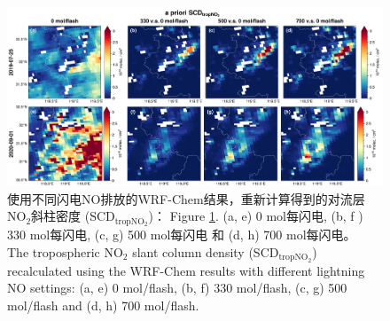 \begin{figure}[htbp]
    \includegraphics[width=17cm]{./figures/s5p_apriori_scd.png}
    \caption{使用不同闪电NO排放的WRF-Chem结果，重新计算得到的对流层NO$_2$斜柱密度 (SCD$_\textrm{tropNO$_2$}$)：
    Figure \ref{fig:s5p_apriori_scd}. (a, e) 0 mol每闪电, (b, f ) 330 mol每闪电, (c, g) 500 mol每闪电 和 (d, h) 700 mol每闪电。\\
    The tropospheric NO$_2$ slant column density (SCD$_\textrm{tropNO$_2$}$) recalculated using the WRF-Chem results with different lightning NO settings: (a, e) 0 mol/flash, (b, f) 330 mol/flash, (c, g) 500 mol/flash and (d, h) 700 mol/flash.
    }
    \label{fig:s5p_apriori_scd}
\end{figure}


